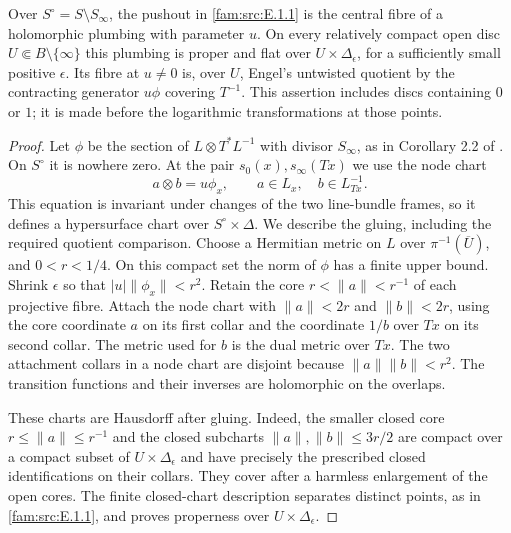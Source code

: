 \begin{proposition}\label{fam:src:E.1.2}\label{fam:st:E.1.2}
Over $S^\circ=S\setminus S_\infty$, the pushout in \ref{fam:src:E.1.1} is the central
fibre of a holomorphic plumbing with parameter $u$. On every relatively
compact open disc $U\Subset B\setminus\{\infty\}$ this plumbing is
proper and flat over $U\times\Delta_\epsilon$, for a sufficiently small
positive $\epsilon$. Its fibre at $u\ne0$ is, over $U$, Engel's untwisted
quotient by the contracting generator $u\phi$ covering $T^{-1}$.
This assertion includes discs containing $0$ or $1$; it is made before
the logarithmic transformations at those points.
\end{proposition}


\begin{proof}
Let $\phi$ be the section of $L\otimes T^*L^{-1}$ with divisor
$S_\infty$, as in Corollary 2.2 of \cite{Engel2026}. On $S^\circ$ it is
nowhere zero. At the pair $s_0(x),s_\infty(Tx)$ we use the node chart
\[
       a\otimes b=u\phi_x,
       \qquad a\in L_x,\quad b\in L^{-1}_{Tx}.                 \tag{E1}
\]
This equation is invariant under changes of the two line-bundle
frames, so it defines a hypersurface chart over $S^\circ\times\Delta$.
We describe the gluing, including the required quotient comparison.
Choose a Hermitian metric on $L$ over $\pi^{-1}(\overline U)$, and
$0<r<1/4$. On this compact set the norm of $\phi$ has a finite upper
bound. Shrink $\epsilon$ so that $|u|\|\phi_x\|<r^2$.
Retain the core $r<\|a\|<r^{-1}$ of each projective fibre. Attach the
node chart with $\|a\|<2r$ and $\|b\|<2r$, using the core coordinate
$a$ on its first collar and the coordinate $1/b$ over $Tx$ on its
second collar. The metric used for $b$ is the dual metric over $Tx$.
The two attachment collars in a node chart are disjoint because
$\|a\|\|b\|<r^2$. The transition functions and their inverses are
holomorphic on the overlaps.

These charts are Hausdorff after gluing. Indeed, the smaller closed
core $r\leq\|a\|\leq r^{-1}$ and the closed subcharts
$\|a\|,\|b\|\leq 3r/2$ are compact over a compact subset of
$U\times\Delta_\epsilon$ and have precisely the prescribed closed
identifications on their collars. They cover after a harmless
enlargement of the open cores. The finite closed-chart description
separates distinct points, as in \ref{fam:src:E.1.1}, and proves properness over
$U\times\Delta_\epsilon$.


\end{proof}
